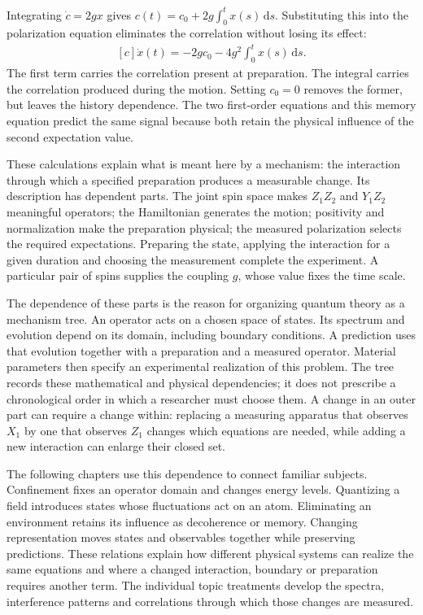\documentclass[11pt,oneside]{book}
\newenvironment{centeredalign}{\[\begin{gathered}[c]}{\end{gathered}\]}
\begin{document}
Integrating \(\dot c=2gx\) gives
\(c(t)=c_0+2g\int_0^t x(s)\,\mathrm ds\). Substituting this into
the polarization equation eliminates the correlation without
losing its effect:
\begin{centeredalign}
\dot x(t)=-2gc_0-4g^2\int_0^t x(s)\,\mathrm ds.
\end{centeredalign}
The first term carries the correlation present at preparation.
The integral carries the correlation produced during the motion.
Setting \(c_0=0\) removes the former, but leaves the history
dependence. The two first-order equations and this memory equation
predict the same signal because both retain the physical influence
of the second expectation value.

These calculations explain what is meant here by a mechanism: the
interaction through which a specified preparation produces a
measurable change. Its description has dependent parts. The joint
spin space makes \(Z_1Z_2\) and \(Y_1Z_2\) meaningful operators;
the Hamiltonian generates the motion; positivity and normalization
make the preparation physical; the measured polarization selects
the required expectations. Preparing the state, applying the
interaction for a given duration and choosing the measurement
complete the experiment. A particular pair of spins supplies the
coupling \(g\), whose value fixes the time scale.

The dependence of these parts is the reason for organizing quantum
theory as a mechanism tree. An operator acts on a chosen space of
states. Its spectrum and evolution depend on its domain, including
boundary conditions. A prediction uses that evolution together
with a preparation and a measured operator. Material parameters
then specify an experimental realization of this problem. The
tree records these mathematical and physical dependencies; it
does not prescribe a chronological order in which a researcher
must choose them. A change in an outer part can require a change
within: replacing a measuring apparatus that observes \(X_1\)
by one that observes \(Z_1\) changes which equations are needed,
while adding a new interaction can enlarge their closed set.

The following chapters use this dependence to connect familiar
subjects. Confinement fixes an operator domain and changes energy
levels. Quantizing a field introduces states whose fluctuations
act on an atom. Eliminating an environment retains its influence
as decoherence or memory. Changing representation moves states
and observables together while preserving predictions. These
relations explain how different physical systems can realize the
same equations and where a changed interaction, boundary or
preparation requires another term. The individual topic
treatments develop the spectra, interference patterns and
correlations through which those changes are measured.
\end{document}
